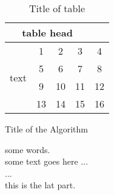 \documentclass[UTF8,a4paper,10pt, twocolumn]{ctexart}
\begin{document}
    \begin{table}[htbp]
		\caption{Title of table} \label{tab:table}
		\centering
		\addtolength{\tabcolsep}{-0mm} %
		\begin{tabular}{ccccc}
			\toprule[0.75pt]	%
			\multicolumn{4}{c}{table head} \\
			\midrule[0.5pt]	%
			\multirow{4}{*}{text} & 1 & 2 & 3 & 4 \\  %
			& 5 & 6 & 7 & 8 \\
			\cmidrule[0.5pt]{2-4}	%
			& 9 & 10 & 11 & 12 \\
			& 13 & 14 & 15 & 16 \\
			\bottomrule[0.75pt]	%
		\end{tabular}
	\end{table}



    \begin{algorithm}
		\caption{Title of the Algorithm}
		\label{algo:ref}
		\begin{algorithmic}[1]
			\REQUIRE some words.  %
			\ENSURE ~\\           %
			some text goes here ... \\
			\STATE ... \\  %
			\ENDWHILE
			\RETURN this is the lat part.  %
		\end{algorithmic}
	\end{algorithm}
\end{document}
